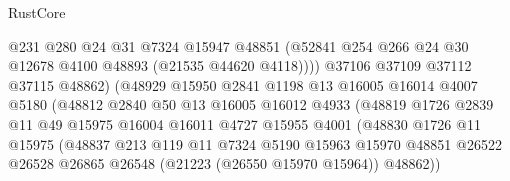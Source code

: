 \begin{lexlean}{RustCore}
\begin{coremodule}
                                @231
                                @280
                                @24
                                @31
                                @7324
                                @15947
                                @48851
                                (@52841
                                  @254
                                  @266
                                  @24
                                  @30
                                  @12678
                                  @4100
                                  @48893
                                  (@21535 @44620 @4118))))
                            @37106
                            @37109
                            @37112
                            @37115
                            @48862)
                          (@48929
                            @15950
                            @2841
                            @1198
                            @13
                            @16005
                            @16014
                            @4007
                            @5180
                            (@48812
                              @2840
                              @50
                              @13
                              @16005
                              @16012
                              @4933
                              (@48819
                                @1726
                                @2839
                                @11
                                @49
                                @15975
                                @16004
                                @16011
                                @4727
                                @15955
                                @4001
                                (@48830
                                  @1726
                                  @11
                                  @15975
                                  (@48837
                                    @213
                                    @119
                                    @11
                                    @7324
                                    @5190
                                    @15963
                                    @15970
                                    @48851
                                    @26522
                                    @26528
                                    @26865
                                    @26548
                                    (@21223 (@26550 @15970 @15964))
                                    @48862))

\end{coremodule}
\end{lexlean}
